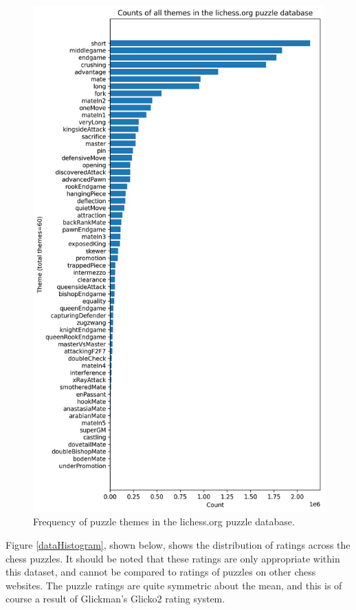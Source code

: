 \begin{figure}
    \centering
    \includegraphics[width=0.9\linewidth]{project/img/puzzle_theme_counts.png}
    \caption{Frequency of puzzle themes in the lichess.org puzzle database.\cite{lichessPuzzles}}
    \label{dataThemeCounts}
\end{figure}

Figure \ref{dataHistogram}, shown below, shows the distribution of ratings
across the chess puzzles. It should be noted that these ratings are only
appropriate within this dataset, and cannot be compared to ratings of puzzles
on other chess websites. The puzzle ratings are quite symmetric about the mean,
and this is of course a result of Glickman's Glicko2 rating
system\cite{glicko}.

